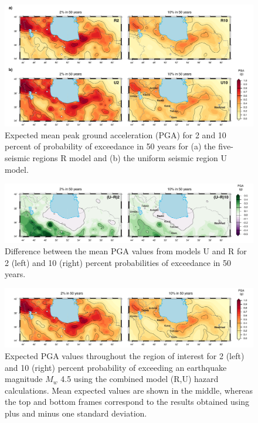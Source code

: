 \begin{figure}[t]
    \centering
    \includegraphics[width=\textwidth]{figures/pdf/figure-10.pdf}
    \caption{Expected mean peak ground acceleration (PGA) for 2 and 10 percent of probability of exceedance in 50 years for (a) the five-seismic regions R model and (b) the uniform seismic region U model.}
    \label{fig:pga}
\end{figure}

\begin{figure}[t]
    \centering
    \includegraphics[width=\textwidth]{figures/pdf/figure-11.pdf}
    \caption{Difference between the mean PGA values from models U and R for 2 (left) and 10 (right) percent probabilities of exceedance in 50 years.}
    \label{fig:pga.diff}
\end{figure}

\begin{figure}[t]
    \centering
    \includegraphics[width=\textwidth]{figures/pdf/figure-12.pdf}
    \caption{Expected PGA values throughout the region of interest for 2 (left) and 10 (right) percent probability of exceeding an earthquake magnitude $M_w$ 4.5 using the combined model (R,U) hazard calculations. Mean expected values are shown in the middle, whereas the top and bottom frames correspond to the results obtained using plus and minus one standard deviation.}
    \label{fig:pga.ru.std}
\end{figure}


